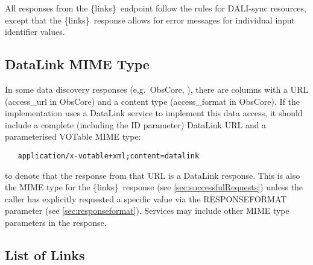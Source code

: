 \documentclass[11pt,a4paper]{ivoa}
\newcommand{\blinks}{\{links\}}
\begin{document}
All responses from the \blinks\ endpoint follow the rules for DALI-sync
resources, except that the \blinks\ response allows for error
messages for individual input identifier values.


\subsection{DataLink MIME Type}
\label{sec:mime}

In some data discovery responses (e.g.\ ObsCore, \citet{2017ivoa.spec.0509L}),
there are columns
with a URL (access\_url in ObsCore) and a content type (access\_format in
ObsCore). If the implementation uses a DataLink service to implement this
data access, it should include a complete (including the ID parameter)
DataLink URL and a parameterised VOTable MIME type:
\begin{verbatim}
   application/x-votable+xml;content=datalink
\end{verbatim}
to denote that the response from that URL is a DataLink response.
This is also the MIME type for the \blinks\ response
(see \ref{sec:successfulRequests})
unless the caller has explicitly requested a specific value
via the RESPONSEFORMAT parameter (see \ref{sec:responseformat}).
Services may include other MIME type parameters in the response.

\subsection{List of Links}
\label{sec:listOfLinks}
\end{document}

